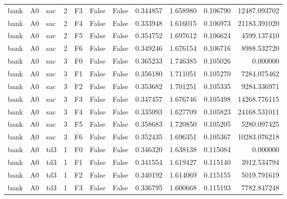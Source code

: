 \begin{tabular}{lllrlllrrrr}
      bank &      A0 &       sac &     2 &  F3 &           False &            False &  0.344857 &  1.658980 & 0.106790 &     12487.093702 \\
      bank &      A0 &       sac &     2 &  F4 &           False &            False &  0.333948 &  1.616015 & 0.106973 &     21183.391020 \\
      bank &      A0 &       sac &     2 &  F5 &           False &            False &  0.354752 &  1.697612 & 0.106624 &      4599.137410 \\
      bank &      A0 &       sac &     2 &  F6 &           False &            False &  0.349246 &  1.676154 & 0.106716 &      8988.532720 \\
      bank &      A0 &       sac &     3 &  F0 &           False &            False &  0.365233 &  1.746385 & 0.105026 &         0.000000 \\
      bank &      A0 &       sac &     3 &  F1 &           False &            False &  0.356180 &  1.711051 & 0.105270 &      7284.075462 \\
      bank &      A0 &       sac &     3 &  F2 &           False &            False &  0.353682 &  1.701251 & 0.105335 &      9284.336971 \\
      bank &      A0 &       sac &     3 &  F3 &           False &            False &  0.347457 &  1.676746 & 0.105498 &     14268.776115 \\
      bank &      A0 &       sac &     3 &  F4 &           False &            False &  0.335093 &  1.627709 & 0.105823 &     24168.531011 \\
      bank &      A0 &       sac &     3 &  F5 &           False &            False &  0.358683 &  1.720850 & 0.105205 &      5280.097425 \\
      bank &      A0 &       sac &     3 &  F6 &           False &            False &  0.352435 &  1.696351 & 0.105367 &     10283.076218 \\
      bank &      A0 &       td3 &     1 &  F0 &           False &            False &  0.346320 &  1.638138 & 0.115084 &         0.000000 \\
      bank &      A0 &       td3 &     1 &  F1 &           False &            False &  0.341554 &  1.619427 & 0.115140 &      3912.534794 \\
      bank &      A0 &       td3 &     1 &  F2 &           False &            False &  0.340192 &  1.614069 & 0.115155 &      5019.791619 \\
      bank &      A0 &       td3 &     1 &  F3 &           False &            False &  0.336795 &  1.600668 & 0.115193 &      7782.847248 \\

\end{tabular}
